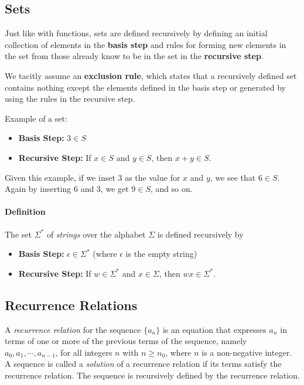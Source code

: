 \subsection{Sets}
Just like with functions, sets are defined recursively by defining an initial collection of elements in the \textbf{basis step} and rules for forming new elements in the set from those already know to be in the set in the \textbf{recursive step}.

We tacitly assume an \textbf{exclusion rule}, which states that a recursively defined set contains nothing except the elements defined in the basis step or generated by using the rules in the recursive step.

Example of a set:
\begin{itemize}
	\item \textbf{Basis Step:} \( 3 \in S \)
	\item \textbf{Recursive Step:} If \( x \in S \) and \( y \in S \), then \( x+y \in S \).
\end{itemize}

Given this example, if we inset \( 3 \) as the value for \( x \) and \( y \), we see that \( 6 \in S \). Again by inserting 6 and 3, we get \( 9 \in S \), and so on.

\paragraph{Definition} The set \( \Sigma^* \) of \emph{strings} over the alphabet \( \Sigma \) is defined recursively by

\begin{itemize}
	\item \textbf{Basis Step: }\(\epsilon \in \Sigma^* \) (where \( \epsilon \) is the empty string)
	\item \textbf{Recursive Step:} If \( w \in \Sigma^*	\) and \( x \in \Sigma \), then \( wx \in \Sigma^* \).  
\end{itemize}


\subsection{Recurrence Relations}
A \emph{recurrence relation} for the sequence \( \{a_n\} \) is an equation that expresses \( a_n \) in terms of one or more of the previous terms of the sequence, namely \( a_0, a_1, \cdots, a_{n-1} \), for all integers \( n \) with \( n \geq n_0 \), where \( n \) is a non-negative integer. A sequence is called a \emph{solution} of a recurrence relation if its terms satisfy the recurrence relation. The sequence is recursively defined by the recurrence relation.

